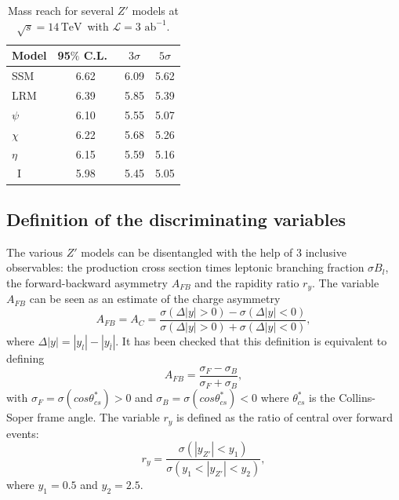 \documentclass[a4paper,11pt]{article}
\newcommand*{\cl}{C.L.~}
\newcommand*{\sqrtslhc}{\ensuremath{\sqrt{s}=14\,\text{TeV}}}
\newcommand*{\intlumihllhc}{\ensuremath{\mathcal{L}=3\text{ ab}^{-1}}}
\begin{document}
%
\begin{table}
\centering
\begin{tabular}{|l|c|c|c|} \hline\hline
  Model &   95$\%$ \cl  &  $3\sigma$  & $5\sigma$   \\
\hline
SSM    &     6.62     &  6.09    &  5.62     \\
LRM    &   6.39     & 5.85     & 5.39  \\
$\psi$    &  6.10   & 5.55   & 5.07  \\
$\chi$   &  6.22    & 5.68    & 5.26   \\
$\eta$   &  6.15     &  5.59  &  5.16   \\
~I        & 5.98   &  5.45   &  5.05  \\
\hline\hline
\end{tabular}
\caption{ Mass reach for several $Z'$ models at \sqrtslhc\ with \intlumihllhc. }
\label{tab:pheno:spec}
\end{table}
%

\subsection{Definition of the discriminating variables}
\label{par:vardef}

The various $Z'$ models can be disentangled with the help of 3 inclusive observables: the production cross section times leptonic branching fraction $\sigma B_l$, the forward-backward asymmetry $A_{FB}$ and the rapidity ratio $r_y$. The variable $A_{FB}$ can be seen as an estimate of the charge asymmetry
\begin{equation}
A_{FB} = A_C =  \frac{\sigma(\Delta|y| > 0) - \sigma(\Delta|y| < 0)}{\sigma(\Delta|y| > 0) + \sigma(\Delta|y| < 0)},
\end{equation}
where $\Delta|y| = |y_l| - |y_{\bar{l}}|$. It has been checked that this definition is equivalent to defining
\begin{equation}
A_{FB} = \frac{\sigma_F - \sigma_B}{\sigma_F + \sigma_B},
\end{equation}
with $\sigma_F = \sigma (cos\theta^{*}_{cs})>0$ and $\sigma_B = \sigma (cos\theta^{*}_{cs})<0$ where $\theta^*_{cs}$ is the Collins-Soper frame angle. The variable $r_y$ is defined as the ratio of central over forward events:
\begin{equation}
r_y = \frac{\sigma(|y_{Z'}| < y_1)}{\sigma(y_1 < |y_{Z'}| <y_2)},
\end{equation}
where $y_1=0.5$ and $y_2=2.5$.
\end{document}
